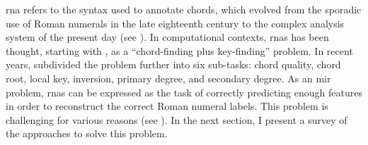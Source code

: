

\gls{rna} refers to the syntax used to annotate chords,
which evolved from the sporadic use of Roman numerals in the
late eighteenth century to the complex analysis system of
the present day (see
). In
computational contexts, \glspl{rna} has been thought, starting with
\textcite{temperley1997algorithm}, as a ``chord-finding plus
key-finding'' problem. In recent years,
\textcite{chen2018functional} subdivided the problem further
into six sub-tasks: chord quality, chord root, local key,
inversion, primary degree, and secondary degree. As an
\gls{mir} problem, \glspl{rna} can be expressed as the task
of correctly predicting enough features in order to
reconstruct the correct Roman numeral labels. This problem
is challenging for various reasons (see
). In the next section, I present a
survey of the approaches to solve this problem.
